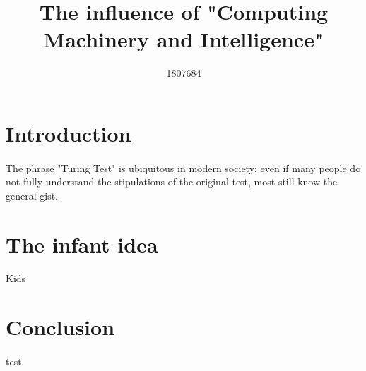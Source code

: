 \documentclass{scrartcl}
\title{The influence of "Computing Machinery and Intelligence"}
\author{1807684}
\begin{document}
\maketitle

\section{Introduction}
\paragraph{}
The phrase "Turing Test" is ubiquitous in modern society; even if many people do not fully understand the stipulations of the original test, most still know the general gist.

\section{The infant idea}
\paragraph{}
Kids\cite{Infants}

\section{Conclusion}
\paragraph{}
test \cite{Main}



\end{document}
